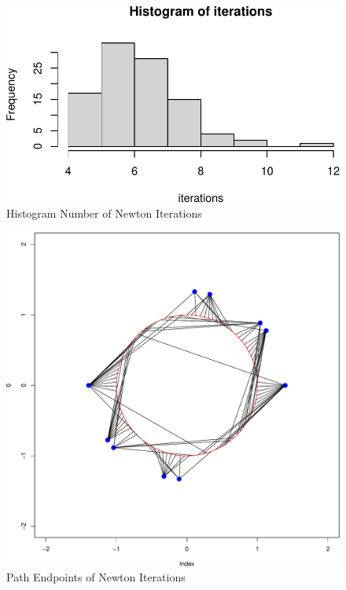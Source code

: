 \documentclass[
  12pt,
  letterpaper,
  DIV=11,
  numbers=noendperiod]{scrreprt}
\theoremstyle{remark}
\begin{document}
\begin{figure}[H]

{\centering \includegraphics{minimization_files/figure-pdf/histnewton-1.pdf}

}

\caption{Histogram Number of Newton Iterations}

\end{figure}%

\begin{figure}[H]

{\centering \includegraphics{minimization_files/figure-pdf/pathnewton-1.pdf}

}

\caption{Path Endpoints of Newton Iterations}

\end{figure}%
\end{document}
